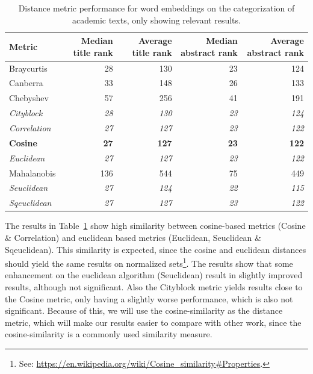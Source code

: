 \documentclass[../../paper.tex]{subfiles}
\begin{document}
\begin{table}[hbt]
\begin{tabular}{|l|r|r|r|r|}
\hline
Metric\footnotemark & Median title rank & Average title rank & Median abstract rank & Average abstract rank  \\
\hline
Braycurtis & 28 & 130 & 23 & 124  \\
\hline
Canberra & 33 & 148 & 26 & 133  \\
\hline
Chebyshev & 57 & 256 & 41 & 191  \\
\hline
\textit{Cityblock} & \textit{28} & \textit{130} & \textit{23} & \textit{124}  \\
\hline
\textit{Correlation} & \textit{27} & \textit{127} & \textit{23} & \textit{122}  \\
\hline
\textbf{Cosine} & \textbf{27} & \textbf{127} & \textbf{23} & \textbf{122}  \\
\hline
\textit{Euclidean} & \textit{27} & \textit{127} & \textit{23} & \textit{122}  \\
\hline
Mahalanobis & 136 & 544 & 75 & 449  \\
\hline
\textit{Seuclidean} & \textit{27} & \textit{124} & \textit{22} & \textit{115}  \\
\hline
\textit{Sqeuclidean} & \textit{27} & \textit{127} & \textit{23} & \textit{122}  \\
\hline
\end{tabular}
\begin{center}
\caption{Distance metric performance for word embeddings on the categorization of academic texts, only showing relevant results.}\label{table:distanceMetrics}
\end{center}
\end{table}
The results in Table~\ref{table:distanceMetrics} show high similarity between cosine-based metrics (Cosine \& Correlation) and euclidean based metrics (Euclidean, Seuclidean \& Sqeuclidean). This similarity is expected, since the cosine and euclidean distances should yield the same results on normalized sets\footnote{See: \url{https://en.wikipedia.org/wiki/Cosine_similarity\#Properties}.}. The results show that some enhancement on the euclidean algorithm (Seuclidean) result in slightly improved results, although not significant. Also the Cityblock metric yields results close to the Cosine metric, only having a slightly worse performance, which is also not significant. Because of this, we will use the cosine-similarity as the distance metric, which will make our results easier to compare with other work, since the cosine-similarity is a commonly used similarity measure.
\end{document}
